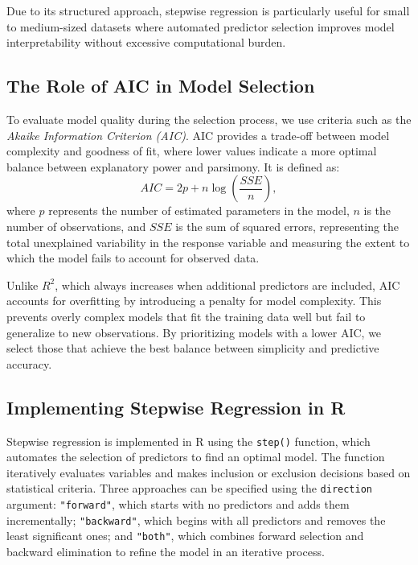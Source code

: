 \documentclass[
]{book}
\newcommand{\passthrough}[1]{#1}
\theoremstyle{definition}
\theoremstyle{definition}
\theoremstyle{definition}
\theoremstyle{definition}
\theoremstyle{remark}
\begin{document}
Due to its structured approach, stepwise regression is particularly useful for small to medium-sized datasets where automated predictor selection improves model interpretability without excessive computational burden.

\subsection*{The Role of AIC in Model Selection}\label{the-role-of-aic-in-model-selection}

To evaluate model quality during the selection process, we use criteria such as the \emph{Akaike Information Criterion (AIC)}. AIC provides a trade-off between model complexity and goodness of fit, where lower values indicate a more optimal balance between explanatory power and parsimony. It is defined as:\\
\[
AIC = 2p + n \log\left(\frac{SSE}{n}\right),
\]
where \(p\) represents the number of estimated parameters in the model, \(n\) is the number of observations, and \(SSE\) is the sum of squared errors, representing the total unexplained variability in the response variable and measuring the extent to which the model fails to account for observed data.

Unlike \(R^2\), which always increases when additional predictors are included, AIC accounts for overfitting by introducing a penalty for model complexity. This prevents overly complex models that fit the training data well but fail to generalize to new observations. By prioritizing models with a lower AIC, we select those that achieve the best balance between simplicity and predictive accuracy.

\subsection*{Implementing Stepwise Regression in R}\label{implementing-stepwise-regression-in-r}

Stepwise regression is implemented in R using the \passthrough{\lstinline!step()!} function, which automates the selection of predictors to find an optimal model. The function iteratively evaluates variables and makes inclusion or exclusion decisions based on statistical criteria. Three approaches can be specified using the \passthrough{\lstinline!direction!} argument: \passthrough{\lstinline!"forward"!}, which starts with no predictors and adds them incrementally; \passthrough{\lstinline!"backward"!}, which begins with all predictors and removes the least significant ones; and \passthrough{\lstinline!"both"!}, which combines forward selection and backward elimination to refine the model in an iterative process.
\end{document}
